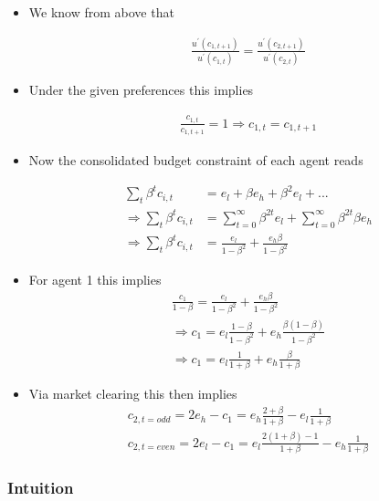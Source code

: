 \documentclass{scrartcl}
\begin{document}
\begin{itemize}
	\item We know from above that

	\begin{align}
	\frac{u^{\prime}(c_{1,t+1})}{u^{\prime}(c_{1,t})}=\frac{u^{\prime}(c_{2,t+1})}{u^{\prime}(c_{2,t})}
	\end{align}

\item Under the given preferences this implies

	\begin{align}
	\frac{c_{1,t}}{c_{1,t+1}}=1 \Rightarrow c_{1,t}=c_{1,t+1}
	\end{align}

\item Now the consolidated budget constraint of each agent reads

\begin{align}
\sum_t \beta^t c_{i,t}&= e_l+\beta e_h+ \beta^2 e_l+...\\
\Rightarrow \sum_t \beta^t c_{i,t}&= \sum_{t=0}^{\infty} \beta ^{2t} e_l+\sum_{t=0}^{\infty} \beta ^{2t} \beta e_h \\
\Rightarrow \sum_t \beta^t c_{i,t}&=\frac{e_l}{1-\beta^2}+\frac{e_h \beta}{1-\beta^2}
\end{align}

\item For agent 1 this implies
\begin{align}
\frac{c_1}{1-\beta}=\frac{e_l}{1-\beta^2}+\frac{e_h \beta}{1-\beta^2} \\\Rightarrow c_1=e_l\frac{1-\beta}{1-\beta^2}+e_h\frac{ \beta(1-\beta)}{1-\beta^2} \\
\Rightarrow c_1=e_l\frac{1}{1+\beta}+e_h\frac{\beta}{1+\beta}
\end{align}

\item Via market clearing this then implies
\begin{align}
c_{2,t=odd}=2e_h-c_1=e_h\frac{2+\beta}{1+\beta}-e_l\frac{1}{1+\beta} \\
c_{2,t=even}=2e_l-c_1 = e_l\frac{2(1+\beta)-1}{1+\beta}-e_h\frac{1}{1+\beta}
\end{align}

\end{itemize}

\subsubsection*{Intuition}
\end{document}
